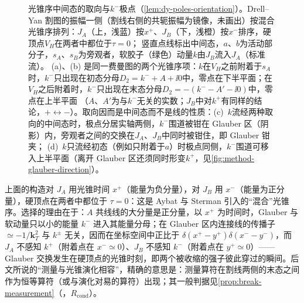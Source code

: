 \begin{figure}[htbp]
\caption{光锥序中间态的取向与$k^-$极点（\cref{lem:dy-poles-orientation}）。Drell--Yan 割图的振幅一侧（割线右侧的共轭振幅为镜像，未画出）按混合光锥序排列：$J_A$（上，浅蓝）按$x^+$、$J_B$（下，浅橙）按$x^-$排序，硬顶点$V_H$在两者中都位于$\tau=0$；
竖直点线标出中间态，$a$、$b$为活动部分子，$s_A$、$s_B$为旁观者，软胶子（绿色）动量$k$由$J_B$流入$J_A$（标准流）。
(a)、(b) 是同一费曼图的两个光锥序项：$k$在$V_H$之前附着于$s_A$时，$k^-$只出现在初态分母$D_2=k^-+A+\ii0$中，零点在下半平面；在$V_H$之后附着时，$k^-$只出现在末态分母$D_2=-(k^--A'-\ii0)$中，零点在上半平面
（$A$、$A'$为与$k^-$无关的实数；$J_B$中对$k^+$有同样的结论，$+\leftrightarrow-$）。取向因而是中间态而不是线的性质：(c)~$k$流经两种取向的中间态时，极点分居实轴两侧，$k^-$围道被钳在 Glauber 区（阴影）内，旁观者之间的交换在$J_A$、$J_B$中同时被钳住，即 Glauber 钳夹；
(d)~$k$只流经初态（例如只附着于$a$）时极点同侧，$k^-$围道可移入上半平面（离开 Glauber 区还须同时形变$k^+$，见\cref{fig:method-glauber-direction}）。}
\label{fig:dy-pole-orientation}
\end{figure}

\begin{remark}[每个喷注一个光锥时间]\label{rem:dy-one-time-per-jet}
上面的构造对 $J_A$ 用光锥时间 $x^+$（能量为负分量），对 $J_B$ 用 $x^-$（能量为正分量），硬顶点在两者中都位于 $\tau=0$：这是 Aybat 与 Sterman 引入的“混合”光锥序\cite{AybatSterman2009}。选择的理由在于：$A$ 共线线的大分量是正分量，以 $x^+$ 为时间时，Glauber 与软动量只以小的能量 $k^-$ 进入其能量分母；在 Glauber 区内连接线的传播子 $\simeq-1/\mathbf k_T^2$ 与 $k^\pm$ 无关，因而在坐标空间中正比于 $\delta(x^+-y^+)\delta(x^--y^-)$，而 $J_A$ 不感知 $k^+$（附着点在 $x^-\simeq0$）、$J_B$ 不感知 $k^-$（附着点在 $y^+\simeq0$）——Glauber 交换发生在硬顶点的光锥时刻，即两个被收缩的强子彼此穿过的瞬间。后文所说的“测量与光锥演化相容”，精确的意思是：测量算符在割线两侧的末态之间作为恒等算符（或与演化对易的算符）出现；其一般判据见\cref{prop:break-measurement}（\tagR，$R_{\mathrm{cond}}$）。
\end{remark}

